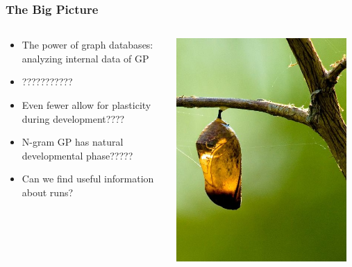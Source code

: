 \documentclass{beamer}
\begin{document}
\begin{frame}
  \frametitle{The Big Picture}
  
  \begin{columns}
  \begin{column}{0.6\textwidth}
  \begin{itemize}
  	\item The power of graph databases: analyzing internal data of GP
	\item ???????????
	\item Even fewer allow for plasticity during development????
	\item N-gram GP has natural developmental phase?????
	\item Can we find useful information about runs?
  \end{itemize}
  \end{column}
  \begin{column}{0.4\textwidth}
   \includegraphics[width=0.95\textwidth]{Illustrations/Empty_cocoon_crop_by_Bluedrakon_from_Flickr.jpg}
       \\
  \end{column}
  \end{columns}
\end{frame}
\end{document}
